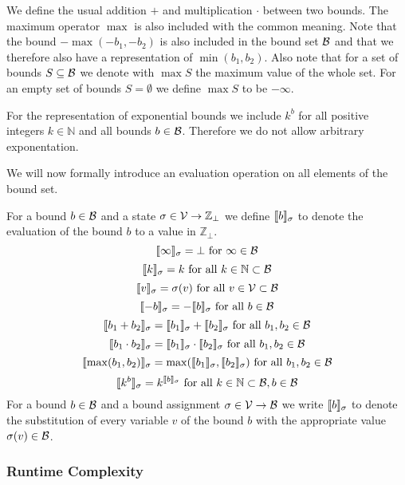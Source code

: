 We define the usual addition $+$ and multiplication $\cdot$ between two bounds.
The maximum operator $\max$ is also included with the common meaning.
Note that the bound $-\max(-b_1,-b_2)$ is also included in the bound set $\mathcal{B}$ and that we therefore also have a representation of $\min(b_1,b_2)$.
Also note that for a set of bounds $S \subseteq \mathcal{B}$ we denote with $\max S$ the maximum value of the whole set.
For an empty set of bounds $S = \emptyset$ we define $\max S$ to be $-\infty$.

For the representation of exponential bounds we include $k^b$ for all positive integers $k \in \mathbb{N}$ and all bounds $b \in \mathcal{B}$.
Therefore we do not allow arbitrary exponentation.


We will now formally introduce an evaluation operation on all elements of the bound set.

\begin{definition}
  For a bound $b \in \mathcal{B}$ and a state $\sigma \in \mathcal{V} \rightarrow \mathbb{Z}_\bot$ we define $\llbracket b \rrbracket_{\sigma}$ to denote the evaluation of the bound $b$ to a value in $\mathbb{Z}_\bot$.
  \[ \llbracket \infty \rrbracket_{\sigma} = \bot \text{ for } \infty \in \mathcal{B} \] 
  \[ \llbracket k \rrbracket_{\sigma} = k \text{ for all } k \in \mathbb{N} \subset \mathcal{B} \] 
  \[ \llbracket v \rrbracket_{\sigma} = \sigma(v) \text{ for all } v \in \mathcal{V} \subset \mathcal{B} \] 
  \[ \llbracket -b \rrbracket_{\sigma} = -\llbracket b \rrbracket_{\sigma} \text{ for all } b \in \mathcal{B} \] 
  \[ \llbracket b_1 + b_2 \rrbracket_{\sigma} = \llbracket b_1 \rrbracket_{\sigma} + \llbracket b_2 \rrbracket_{\sigma} \text{ for all } b_1, b_2 \in \mathcal{B} \] 
  \[ \llbracket b_1 \cdot b_2 \rrbracket_{\sigma} = \llbracket b_1 \rrbracket_{\sigma} \cdot \llbracket b_2 \rrbracket_{\sigma} \text{ for all } b_1, b_2 \in \mathcal{B} \] 
  \[ \llbracket \max(b_1, b_2) \rrbracket_{\sigma} = \max(\llbracket b_1 \rrbracket_{\sigma}, \llbracket b_2 \rrbracket_{\sigma}) \text{ for all } b_1, b_2 \in \mathcal{B} \]
  \[ \llbracket k^b \rrbracket_{\sigma} = k^{\llbracket b \rrbracket_{\sigma}} \text{ for all } k \in \mathbb{N} \subset \mathcal{B}, b \in \mathcal{B} \]  
  For a bound $b \in \mathcal{B}$ and a bound assignment $\sigma \in \mathcal{V} \rightarrow \mathcal{B}$ we write $\llbracket b \rrbracket_{\sigma}$ to denote the substitution of every variable $v$ of the bound $b$ with the appropriate value $\sigma(v) \in \mathcal{B}$.
\end{definition}

\subsubsection{Runtime Complexity}

